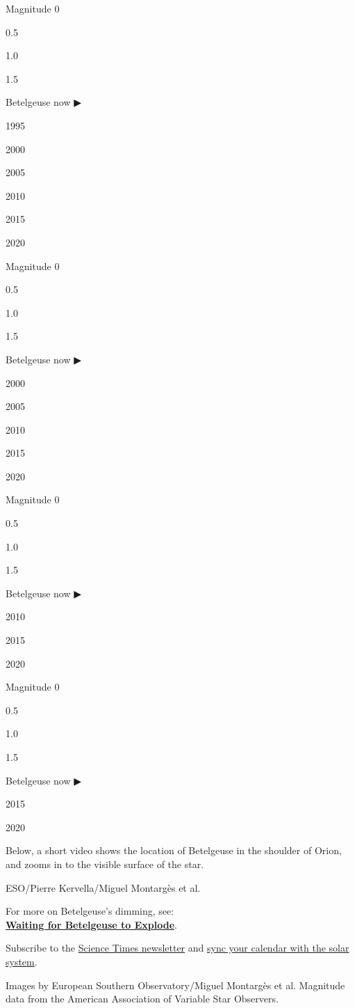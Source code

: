 Magnitude 0

0.5

1.0

1.5

Betelgeuse now ▶

1995

2000

2005

2010

2015

2020

Magnitude 0

0.5

1.0

1.5

Betelgeuse now ▶

2000

2005

2010

2015

2020

Magnitude 0

0.5

1.0

1.5

Betelgeuse now ▶

2010

2015

2020

Magnitude 0

0.5

1.0

1.5

Betelgeuse now ▶

2015

2020

Below, a short video shows the location of Betelgeuse in the shoulder of
Orion, and zooms in to the visible surface of the star.

ESO/Pierre Kervella/Miguel Montargès et al.

For more on Betelgeuse's dimming, see:\\
\textbf{\href{https://www.nytimes3xbfgragh.onion/interactive/2020/01/09/science/betelgeuse-supernova-fading.html}{Waiting
for Betelgeuse to Explode}}.

Subscribe to the \href{http://nyti.ms/1MbHaRU}{Science Times newsletter}
and
\href{https://www.nytimes3xbfgragh.onion/interactive/2019/science/astronomy-space-calendar.html}{sync
your calendar with the solar system}.

Images by European Southern Observatory/Miguel Montargès et al.
Magnitude data from the American Association of Variable Star Observers.

